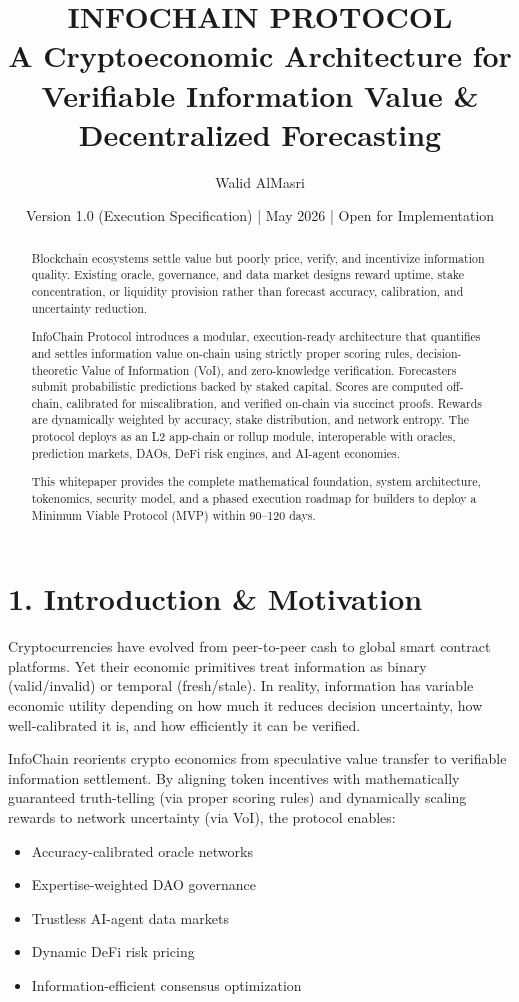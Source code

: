 \documentclass[11pt,a4paper]{article}
\title{\textbf{\large INFOCHAIN PROTOCOL}\\
\medskip A Cryptoeconomic Architecture for Verifiable Information Value \& Decentralized Forecasting}
\author{Walid AlMasri}
\date{\small Version 1.0 (Execution Specification) \quad | \quad May 2026 \quad | \quad Open for Implementation}
\begin{document}
\maketitle
\thispagestyle{fancy}

\begin{abstract}
\noindent Blockchain ecosystems settle value but poorly price, verify, and incentivize information quality. Existing oracle, governance, and data market designs reward uptime, stake concentration, or liquidity provision rather than forecast accuracy, calibration, and uncertainty reduction. 

InfoChain Protocol introduces a modular, execution-ready architecture that quantifies and settles information value on-chain using strictly proper scoring rules, decision-theoretic Value of Information (VoI), and zero-knowledge verification. Forecasters submit probabilistic predictions backed by staked capital. Scores are computed off-chain, calibrated for miscalibration, and verified on-chain via succinct proofs. Rewards are dynamically weighted by accuracy, stake distribution, and network entropy. The protocol deploys as an L2 app-chain or rollup module, interoperable with oracles, prediction markets, DAOs, DeFi risk engines, and AI-agent economies.

This whitepaper provides the complete mathematical foundation, system architecture, tokenomics, security model, and a phased execution roadmap for builders to deploy a Minimum Viable Protocol (MVP) within 90--120 days.
\end{abstract}

\section*{1. Introduction \& Motivation}
Cryptocurrencies have evolved from peer-to-peer cash to global smart contract platforms. Yet their economic primitives treat information as binary (valid/invalid) or temporal (fresh/stale). In reality, information has variable economic utility depending on how much it reduces decision uncertainty, how well-calibrated it is, and how efficiently it can be verified.

InfoChain reorients crypto economics from speculative value transfer to verifiable information settlement. By aligning token incentives with mathematically guaranteed truth-telling (via proper scoring rules) and dynamically scaling rewards to network uncertainty (via VoI), the protocol enables:
\begin{itemize}[leftmargin=*]
    \item Accuracy-calibrated oracle networks
    \item Expertise-weighted DAO governance
    \item Trustless AI-agent data markets
    \item Dynamic DeFi risk pricing
    \item Information-efficient consensus optimization
\end{itemize}
\end{document}
